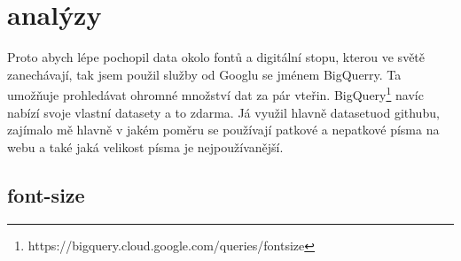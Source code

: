 \documentclass[a4paper]{article}
\begin{document}
\section{analýzy}
Proto abych lépe pochopil data okolo fontů a digitální stopu, kterou ve světě zanechávají, tak jsem použil služby od Googlu se jménem BigQuerry. Ta umožňuje prohledávat ohromné množství dat za pár vteřin. BigQuery\footnote{https://bigquery.cloud.google.com/queries/fontsize} navíc nabízí svoje vlastní datasety a to zdarma. Já využil hlavně datasetuod githubu, zajímalo mě hlavně v jakém poměru se používají patkové a nepatkové písma na webu a také jaká velikost písma je nejpoužívanější.
\subsection{font-size}
\end{document}
